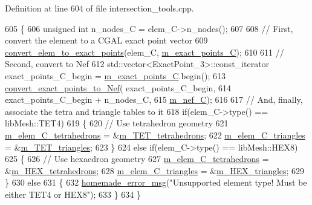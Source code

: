 Definition at line 604 of file intersection\+\_\+tools.\+cpp.


\begin{DoxyCode}
605 \{
606     \textcolor{keywordtype}{unsigned} \textcolor{keywordtype}{int} n\_nodes\_C = elem\_C->n\_nodes();
607 
608     \textcolor{comment}{// First, convert the element to a CGAL exact point vector}
609     \hyperlink{classcarl_1_1_intersection___tools_a1d6303ff6ffc19b6df42626e29a507ce}{convert\_elem\_to\_exact\_points}(elem\_C,
      \hyperlink{classcarl_1_1_intersection___tools_a473d6a254b10623659a1d8f81bbe695f}{m\_exact\_points\_C});
610 
611     \textcolor{comment}{// Second, convert to Nef}
612     std::vector<ExactPoint\_3>::const\_iterator exact\_points\_C\_begin = 
      \hyperlink{classcarl_1_1_intersection___tools_a473d6a254b10623659a1d8f81bbe695f}{m\_exact\_points\_C}.begin();
613     \hyperlink{classcarl_1_1_intersection___tools_af689c53cf00359c518234d8d070c4e53}{convert\_exact\_points\_to\_Nef}( exact\_points\_C\_begin,
614                                     exact\_points\_C\_begin + n\_nodes\_C,
615                                     \hyperlink{classcarl_1_1_intersection___tools_adf2892a8902442fbfebb913e9a4fb8ac}{m\_nef\_C});
616 
617     \textcolor{comment}{// And, finally, associate the tetra and triangle tables to it}
618     \textcolor{keywordflow}{if}(elem\_C->type() == libMesh::TET4)
619     \{
620         \textcolor{comment}{// Use tetrahedron geometry}
621         \hyperlink{classcarl_1_1_intersection___tools_a2f6b6fff82b9a02400d3aeb3db1f4c82}{m\_elem\_C\_tetrahedrons} = &\hyperlink{classcarl_1_1_intersection___tools_a6e9a49f3b382810c884ba46b791bfcb8}{m\_TET\_tetrahedrons};
622         \hyperlink{classcarl_1_1_intersection___tools_a89a78135b49b49c32bec8be4016782b3}{m\_elem\_C\_triangles} = &\hyperlink{classcarl_1_1_intersection___tools_a54e026b256ab6894b1f77950a425b1eb}{m\_TET\_triangles};
623     \}
624     \textcolor{keywordflow}{else} \textcolor{keywordflow}{if}(elem\_C->type() == libMesh::HEX8)
625     \{
626         \textcolor{comment}{// Use hexaedron geometry}
627         \hyperlink{classcarl_1_1_intersection___tools_a2f6b6fff82b9a02400d3aeb3db1f4c82}{m\_elem\_C\_tetrahedrons} = &\hyperlink{classcarl_1_1_intersection___tools_af74ec1bcb1a896df19642d340dd2762c}{m\_HEX\_tetrahedrons};
628         \hyperlink{classcarl_1_1_intersection___tools_a89a78135b49b49c32bec8be4016782b3}{m\_elem\_C\_triangles} = &\hyperlink{classcarl_1_1_intersection___tools_aca79d0350f0969670dd9d06814c26583}{m\_HEX\_triangles};
629     \}
630     \textcolor{keywordflow}{else}
631     \{
632         \hyperlink{common__header_8h_a05d65d26b911668ac90085745dca71f6}{homemade\_error\_msg}(\textcolor{stringliteral}{"Unsupported element type! Must be either TET4 or HEX8"});
633     \}
634 \}
\end{DoxyCode}
\hypertarget{classcarl_1_1_intersection___tools_ac2eb9f8074d4dc2511b3f36d3cfd5f3b}{}
